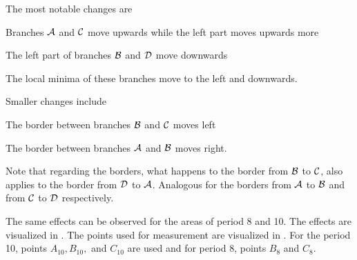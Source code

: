 The most notable changes are
\begin{enumerate*}
    \item Branches $\mathcal{A}$ and $\mathcal{C}$ move upwards while the left part moves upwards more
    \item The left part of branches $\mathcal{B}$ and $\mathcal{D}$ move downwards 
    \item The local minima of these branches move to the left and downwards.
\end{enumerate*}
Smaller changes include
\begin{enumerate*}
    \item The border between branches $\mathcal{B}$ and $\mathcal{C}$ moves left
    \item The border between branches $\mathcal{A}$ and $\mathcal{B}$ moves right.
\end{enumerate*}
Note that regarding the borders, what happens to the border from $\mathcal{B}$ to $\mathcal{C}$, also applies to the border from $\mathcal{D}$ to $\mathcal{A}$.
Analogous for the borders from $\mathcal{A}$ to $\mathcal{B}$ and from $\mathcal{C}$ to $\mathcal{D}$ respectively.

The same effects can be observed for the areas of period 8 and 10.
The effects are visualized in .
The points used for measurement are visualized in .
For the period 10, points $A_{10}, B_{10},$ and $C_{10}$ are used and for period 8, points $B_8$ and $C_8$.
